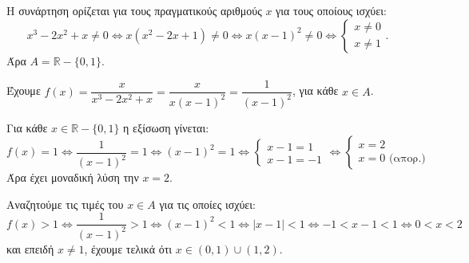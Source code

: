 
\begin{alist}
\item Η συνάρτηση ορίζεται για τους πραγματικούς αριθμούς $x$ για τους οποίους ισχύει:
\[x^3 - 2x^2 + x \ne 0 \Leftrightarrow x(x^2 - 2x + 1) \ne 0 \Leftrightarrow x(x - 1)^2 \ne 0 \Leftrightarrow \begin{cases} x \ne 0 \\ x \ne 1 \end{cases}.\]
Άρα $A = \mathbb{R} - \{0, 1\}$.

\item Έχουμε $f(x) = \dfrac{x}{x^3 - 2x^2 + x} = \dfrac{x}{x(x - 1)^2} = \dfrac{1}{(x - 1)^2}$, για κάθε $x \in A$.

\item Για κάθε $x \in \mathbb{R} - \{0, 1\}$ η εξίσωση γίνεται:
\[f(x) = 1 \Leftrightarrow \dfrac{1}{(x - 1)^2} = 1 \Leftrightarrow (x - 1)^2 = 1 \Leftrightarrow \begin{cases} x - 1 = 1 \\ x - 1 = -1 \end{cases} \Leftrightarrow \begin{cases} x = 2 \\ x = 0 \text{ (απορ.)} \end{cases}\]
Άρα έχει μοναδική λύση την $x = 2$.

\item Αναζητούμε τις τιμές του $x \in A$ για τις οποίες ισχύει:
\[f(x) > 1 \Leftrightarrow \dfrac{1}{(x - 1)^2} > 1 \Leftrightarrow (x - 1)^2 < 1 \Leftrightarrow |x - 1| < 1 \Leftrightarrow -1 < x - 1 < 1 \Leftrightarrow 0 < x < 2\]
και επειδή $x \ne 1$, έχουμε τελικά ότι $x \in (0, 1) \cup (1, 2)$.
\end{alist}

